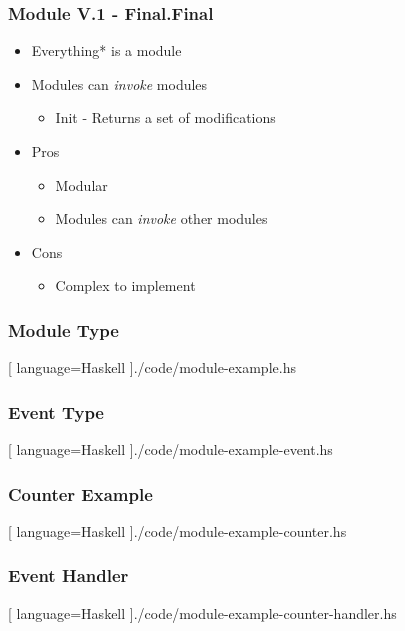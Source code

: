 \showlogo
\begin{frame}
  \frametitle{Module V.1 - Final.Final}
  \begin{itemize}
    \item Everything* is a module
      \pause
    \item Modules can \textit{invoke} modules
      \pause
    \begin{itemize}
      \item Init - Returns a set of modifications
    \end{itemize}
    \pause
    \item Pros
    \pause
    \begin{itemize}
      \item Modular
        \pause
      \item Modules can \textit{invoke} other modules
    \end{itemize}
    \pause
    \item Cons
    \begin{itemize}
        \pause
      \item Complex to implement
    \end{itemize}
  \end{itemize}
\end{frame}

\begin{frame}
  \frametitle{Module Type}
  \begin{center}
    
    [ language=Haskell
    ]{./code/module-example.hs}
  \end{center}
\end{frame}


\begin{frame}
  \frametitle{Event Type}
  \begin{center}
    
    [ language=Haskell
    ]{./code/module-example-event.hs}
  \end{center}
\end{frame}


\begin{frame}
  \frametitle{Counter Example}
  \begin{center}
    
    [ language=Haskell
    ]{./code/module-example-counter.hs}
  \end{center}
\end{frame}


\begin{frame}
  \frametitle{Event Handler}
  \begin{center}
    
    [ language=Haskell
    ]{./code/module-example-counter-handler.hs}
  \end{center}
\end{frame}
